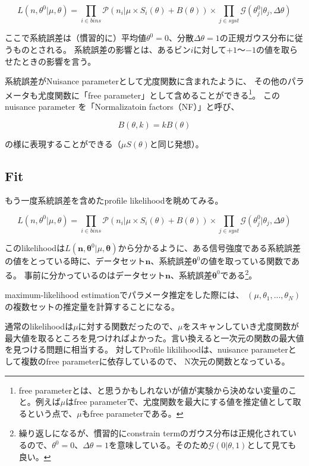 \begin{equation}
L(n,\theta^0|\mu,\theta) = \prod_{i\in bins} \mathcal{P}(n_i|\mu \times S_i(\theta)+B(\theta)) \times \prod_{j\in syst} \mathcal{G}(\theta_j^0|\theta_j,\Delta \theta)
\end{equation}

ここで系統誤差は（慣習的に）平均値$\theta^0=0$、分散$\Delta \theta=1$の正規ガウス分布に従うものとされる。
系統誤差の影響とは、あるビン$i$に対して$+1$〜$-1$の値を取らせたときの影響を言う。

系統誤差がNuisance parameterとして尤度関数に含まれたように、
その他のパラメータも尤度関数に「free parameter」として含めることができる\footnote{free parameterとは、と思うかもしれないが値が実験から決めない変量のこと。例えば$\mu$はfree parameterで、尤度関数を最大にする値を推定値として取るという点で、$\mu$もfree parameterである。}。
この nuisance parameter を「Normalizatoin factors（NF）」と呼び、

\begin{equation}
B(\theta,k)=kB(\theta)
\end{equation}

の様に表現することができる（$\mu S(\theta)$と同じ発想）。

\subsection{Fit}

もう一度系統誤差を含めたprofile likelihoodを眺めてみる。

\begin{equation}
L(n,\theta^0|\mu,\theta) = \prod_{i\in bins} \mathcal{P}(n_i|\mu \times S_i(\theta)+B(\theta)) \times \prod_{j\in syst} \mathcal{G}(\theta_j^0|\theta_j,\Delta \theta)
\end{equation}

このlikelihoodは$L(\bm{n},\bm{\theta}^0|\mu,\bm{\theta})$から分かるように、ある信号強度である系統誤差の値をとっている時に、データセット$\bm{n}$、系統誤差$\bm{\theta}^0$の値を取っている関数である。
事前に分かっているのはデータセット$\bm{n}$、系統誤差$\bm{\theta}^0$である\footnote{繰り返しになるが、慣習的にconstrain termのガウス分布は正規化されているので、$\theta^0=0$、$\Delta \theta=1$を意味している。そのため$\mathcal{G}(0|\theta,1)$として見ても良い。}。

maximum-likelihood estimationでパラメータ推定をした際には、
$(\mu,\theta_1,...,\theta_N )$の複数セットの推定量を計算することになる。

通常のlikelihoodは$\mu$に対する関数だったので、$\mu$をスキャンしていき尤度関数が最大値を取るところを見つければよかった。言い換えると一次元の関数の最大値を見つける問題に相当する。
対してProfile likilihoodは、nuisance parameterとして複数のfree parameterに依存しているので、
N次元の関数となっている。


